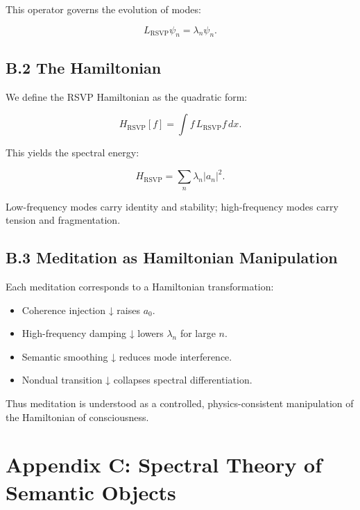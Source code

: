 \documentclass[12pt]{article}
\begin{document}
This operator governs the evolution of modes:

\[
L_{\text{RSVP}} \psi_n = \lambda_n \psi_n.
\]

\subsection*{B.2 The Hamiltonian}

We define the RSVP Hamiltonian as the quadratic form:

\[
H_{\text{RSVP}}[f]
=
\int f\, L_{\text{RSVP}} f \, dx.
\]

This yields the spectral energy:

\[
H_{\text{RSVP}}
=
\sum_{n} \lambda_n |a_n|^2.
\]

Low-frequency modes carry identity and stability;
high-frequency modes carry tension and fragmentation.

\subsection*{B.3 Meditation as Hamiltonian Manipulation}

Each meditation corresponds to a Hamiltonian transformation:

\begin{itemize}
    \item Coherence injection ↓ raises $a_0$.
    \item High-frequency damping ↓ lowers $\lambda_n$ for large $n$.
    \item Semantic smoothing ↓ reduces mode interference.
    \item Nondual transition ↓ collapses spectral differentiation.
\end{itemize}

Thus meditation is understood as a controlled, physics-consistent manipulation
of the Hamiltonian of consciousness.


\section*{Appendix C: Spectral Theory of Semantic Objects}
\end{document}
